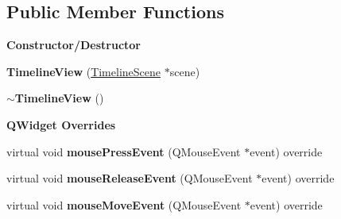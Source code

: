 \subsection*{Public Member Functions}
\begin{Indent}\textbf{ Constructor/\+Destructor}\par
\begin{DoxyCompactItemize}
\item 
\mbox{\label{classrev_1_1_view_1_1_timeline_view_a31a3002e89db360810dfc5c9bcca8062}} 
{\bfseries Timeline\+View} (\mbox{\hyperlink{classrev_1_1_view_1_1_timeline_scene}{Timeline\+Scene}} $\ast$scene)
\item 
\mbox{\label{classrev_1_1_view_1_1_timeline_view_a5b5732fb6ff0a280d95f3f4a9722c77b}} 
{\bfseries $\sim$\+Timeline\+View} ()
\end{DoxyCompactItemize}
\end{Indent}
\begin{Indent}\textbf{ Q\+Widget Overrides}\par
\begin{DoxyCompactItemize}
\item 
\mbox{\label{classrev_1_1_view_1_1_timeline_view_a99a72b5b3928104ff7fab3e48ebf8ec9}} 
virtual void {\bfseries mouse\+Press\+Event} (Q\+Mouse\+Event $\ast$event) override
\item 
\mbox{\label{classrev_1_1_view_1_1_timeline_view_a2e49e0387666be3d7f3c35b84fa520bc}} 
virtual void {\bfseries mouse\+Release\+Event} (Q\+Mouse\+Event $\ast$event) override
\item 
\mbox{\label{classrev_1_1_view_1_1_timeline_view_a018b7f637346706ca19ca8900bdd5ec1}} 
virtual void {\bfseries mouse\+Move\+Event} (Q\+Mouse\+Event $\ast$event) override
\end{DoxyCompactItemize}
\end{Indent}
